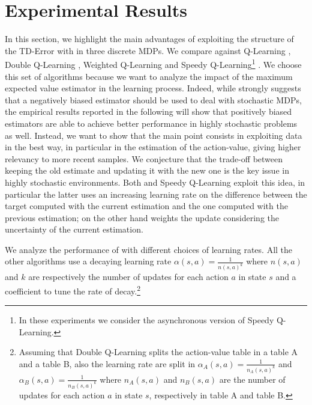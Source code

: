 \documentclass[conference]{IEEEtran}
\begin{document}
\section{Experimental Results}\label{S:empirical}
In this section, we highlight the main advantages of exploiting the structure of the TD-Error with \alg in three discrete MDPs. We compare \alg against Q-Learning \cite{watkins1992q}, Double Q-Learning \cite{van2010double}, Weighted Q-Learning \cite{d2016estimating} and Speedy Q-Learning\footnote{In these experiments we consider the asynchronous version of Speedy Q-Learning.} \cite{NIPS2011_4251}. We choose this set of algorithms because we want to analyze the impact of the maximum expected value estimator in the learning process. Indeed, while \cite{van2010double} strongly suggests that a negatively biased estimator should be used to deal with stochastic MDPs, the  empirical results reported in the following will show that positively biased estimators are able to achieve better performance in highly stochastic problems as well. Instead, we want to show that the main point consists in exploiting data in the best way, in particular in the estimation of the action-value, giving higher relevancy to more recent samples. We conjecture that the trade-off between keeping the old estimate and updating it with the new one is the key issue in highly stochastic environments. Both \alg and Speedy Q-Learning exploit this idea, in particular the latter uses an increasing learning rate on the difference between the target computed with the current estimation and the one computed with the previous estimation; on the other hand \alg weights the update considering the uncertainty of the current estimation.

We analyze the performance of \alg with different choices of learning rates. All the other algorithms use a decaying learning rate $\alpha(s, a) = \frac{1}{n(s, a)^{k}}$ where $n(s, a)$ and $k$ are respectively the number of updates for each action $a$ in state $s$ and a coefficient to tune the rate of decay.\footnote{Assuming that Double Q-Learning splits the action-value table in a table A and a table B, also the learning rate are split in $\alpha_A(s, a) = \frac{1}{n_A(s, a)^{k}}$ and $\alpha_B(s, a) = \frac{1}{n_B(s, a)^{k}}$ where $n_A(s, a)$ and $n_B(s, a)$ are the number of updates for each action $a$ in state $s$, respectively in table A and table B.}
\end{document}
